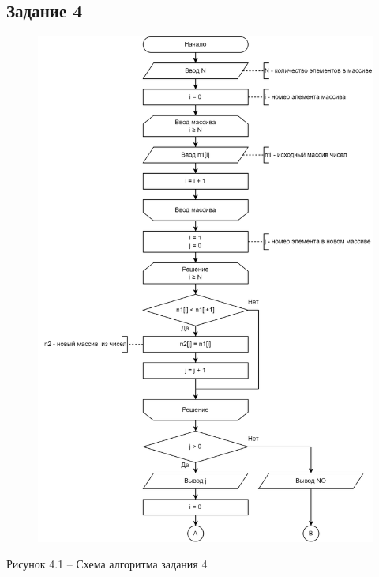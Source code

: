 \documentclass[a4paper,14pt]{extarticle}
\begin{document}
  \subsection*{Задание 4}
  \begin{figure}[h]
    \centering
    \includegraphics[width=0.78\linewidth]{schemes/s-4-1}
  \end{figure}
  \begin{center}
    Рисунок 4.1 – Схема алгоритма задания 4
  \end{center}
\end{document}
